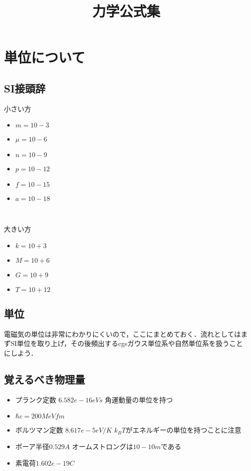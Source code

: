 \documentclass[a4j]{jarticle}
\title{力学公式集}
\begin{document}
\section{単位について}
\subsection{SI接頭辞}
小さい方
\begin{itemize}
 \item $m=10-3$
 \item $\mu=10-6$
 \item $n=10-9$
 \item $p=10-12$
 \item $f=10-15$
 \item $a=10-18$
\end{itemize}　

大きい方
\begin{itemize}
 \item $k=10+3$
 \item $M=10+6$
 \item $G=10+9$
 \item $T=10+12$
\end{itemize}

\subsection{単位}
電磁気の単位は非常にわかりにくいので，ここにまとめておく．流れとしてはまずSI単位を取り上げ，その後頻出するcgsガウス単位系や自然単位系を扱うことにしよう．


\subsection{覚えるべき物理量}
\begin{itemize}
 \item  プランク定数 $6.582e-16eVs$ 角運動量の単位を持つ
 \item  $\hbar c =200MeV fm$
 \item ボルツマン定数 $8.617e-5eV/K$ $k_BT$がエネルギーの単位を持つことに注意
 \item ボーア半径$0.529A$ オームストロングは$10-10m$である
 \item 素電荷$1.602e-19C$
\end{itemize}
\end{document}
